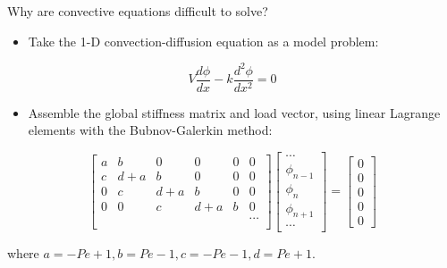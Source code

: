 \documentclass{beamer}
\begin{document}

\begin{frame}{Why are convective equations difficult to solve?}

\begin{itemize}
\item Take the 1-D convection-diffusion equation as a model problem:
\end{itemize}

\begin{equation}
V\frac{d\phi}{dx}-k\frac{d^2\phi}{dx^2}=0
\end{equation}

\begin{itemize}
\item Assemble the global stiffness matrix and load vector, using linear Lagrange elements with the Bubnov-Galerkin method:
\end{itemize}

\begin{equation}
\begin{bmatrix} a & b & 0 & 0 & 0 & 0\\
			c & d + a & b & 0 & 0 & 0\\
			0 & c & d + a & b & 0 & 0\\
			0 & 0 & c & d + a & b & 0\\
			 & & & &  & \cdots \\\end{bmatrix}
\begin{bmatrix}\cdots \\ \phi_{n-1}\\\phi_{n}\\\phi_{n+1}\\\cdots\end{bmatrix}=
\begin{bmatrix}0 \\ 0 \\ 0 \\ 0 \\ 0\end{bmatrix}
\end{equation}

where \(a=-Pe+1, b=Pe-1, c=-Pe-1, d=Pe+1\). 

\end{frame}

\end{document}
